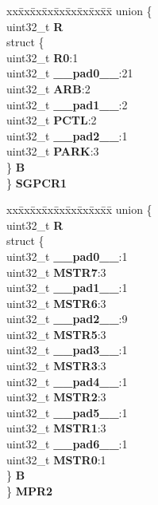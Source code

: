 \begin{DoxyCompactItemize}
\begin{tabbing}
\end{tabbing}\item 
\mbox{\label{structXBAR__tag_a9760136657b9d6ebd631b2f18f018845}} 
\begin{tabbing}
xx\=xx\=xx\=xx\=xx\=xx\=xx\=xx\=xx\=\kill
union \{\\
\>uint32\_t {\bfseries R}\\
\>struct \{\\
\>\>uint32\_t {\bfseries R0}:1\\
\>\>uint32\_t {\bfseries \_\_pad0\_\_}:21\\
\>\>uint32\_t {\bfseries ARB}:2\\
\>\>uint32\_t {\bfseries \_\_pad1\_\_}:2\\
\>\>uint32\_t {\bfseries PCTL}:2\\
\>\>uint32\_t {\bfseries \_\_pad2\_\_}:1\\
\>\>uint32\_t {\bfseries PARK}:3\\
\>\} {\bfseries B}\\
\} {\bfseries SGPCR1}\\

\end{tabbing}\item 
\mbox{\label{structXBAR__tag_ae64822545a8099491563000ecd1e8cc8}} 
\begin{tabbing}
xx\=xx\=xx\=xx\=xx\=xx\=xx\=xx\=xx\=\kill
union \{\\
\>uint32\_t {\bfseries R}\\
\>struct \{\\
\>\>uint32\_t {\bfseries \_\_pad0\_\_}:1\\
\>\>uint32\_t {\bfseries MSTR7}:3\\
\>\>uint32\_t {\bfseries \_\_pad1\_\_}:1\\
\>\>uint32\_t {\bfseries MSTR6}:3\\
\>\>uint32\_t {\bfseries \_\_pad2\_\_}:9\\
\>\>uint32\_t {\bfseries MSTR5}:3\\
\>\>uint32\_t {\bfseries \_\_pad3\_\_}:1\\
\>\>uint32\_t {\bfseries MSTR3}:3\\
\>\>uint32\_t {\bfseries \_\_pad4\_\_}:1\\
\>\>uint32\_t {\bfseries MSTR2}:3\\
\>\>uint32\_t {\bfseries \_\_pad5\_\_}:1\\
\>\>uint32\_t {\bfseries MSTR1}:3\\
\>\>uint32\_t {\bfseries \_\_pad6\_\_}:1\\
\>\>uint32\_t {\bfseries MSTR0}:1\\
\>\} {\bfseries B}\\
\} {\bfseries MPR2}\\


\end{tabbing}
\end{DoxyCompactItemize}
